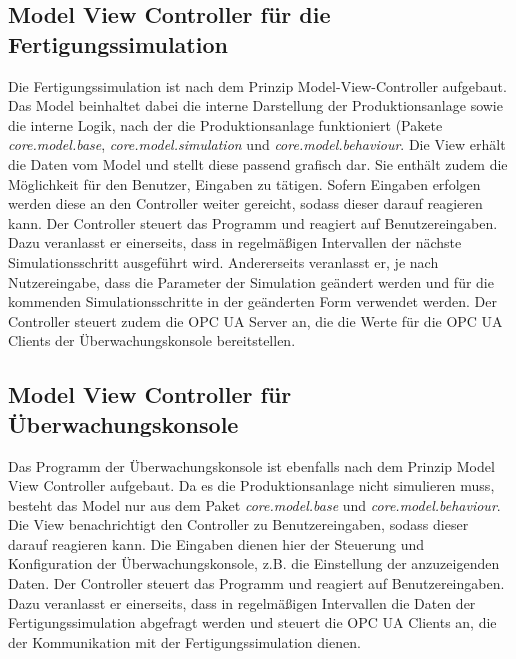 \documentclass[parskip=full]{scrartcl}
\begin{document}
\subsection{Model View Controller f\"ur die Fertigungssimulation}
\label{mvc}
Die Fertigungssimulation ist nach dem Prinzip Model-View-Controller aufgebaut.
Das Model beinhaltet dabei die interne Darstellung der Produktionsanlage sowie die interne Logik, nach der die Produktionsanlage funktioniert
(Pakete \emph{core.model.base}, \emph{core.model.simulation} und \emph{core.model.behaviour}.
Die View erh\"alt die Daten vom Model und stellt diese passend grafisch dar. Sie enth\"alt zudem die M\"oglichkeit f\"ur den Benutzer, Eingaben zu
t\"atigen. Sofern Eingaben erfolgen werden diese an den Controller weiter gereicht, sodass dieser darauf reagieren kann.
Der Controller steuert das Programm und reagiert auf Benutzereingaben. Dazu veranlasst er einerseits, dass in regelm\"a{\ss}igen Intervallen der
n\"achste Simulationsschritt ausgef\"uhrt wird. Andererseits veranlasst er, je nach Nutzereingabe, dass die Parameter der Simulation ge\"andert werden
und f\"ur die kommenden Simulationsschritte in der ge\"anderten Form verwendet werden. Der Controller steuert zudem die OPC UA Server an, die die
Werte f\"ur die OPC UA Clients der \"Uberwachungskonsole bereitstellen.

\subsection{Model View Controller f\"ur \"Uberwachungskonsole}
Das Programm der \"Uberwachungskonsole ist ebenfalls nach dem Prinzip Model View Controller aufgebaut.
Da es die Produktionsanlage nicht simulieren muss, besteht das Model nur aus dem Paket \emph{core.model.base} und \emph{core.model.behaviour}.
Die View benachrichtigt den Controller zu Benutzereingaben, sodass dieser darauf reagieren kann. Die Eingaben dienen hier der Steuerung und Konfiguration
der \"Uberwachungskonsole, z.B. die Einstellung der anzuzeigenden Daten.
Der Controller steuert das Programm und reagiert auf Benutzereingaben. Dazu veranlasst er einerseits, dass in regelm\"a{\ss}igen Intervallen die Daten der
Fertigungssimulation abgefragt werden und steuert die OPC UA Clients an, die der Kommunikation mit der Fertigungssimulation dienen.

\pagebreak
\end{document}
